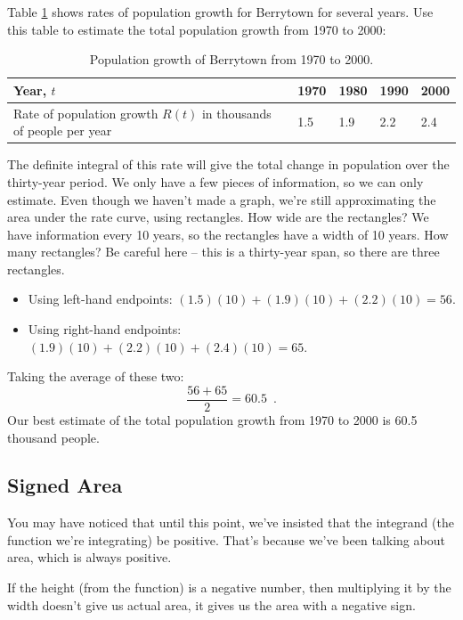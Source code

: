 \begin{example}
Table \ref{tab:5-3-population} shows rates of population growth for Berrytown for several years. Use this table to estimate the total population growth from 1970 to 2000:
\begin{table}[ht!]
  \centering
\begin{tabular}{lllll}
  \toprule
Year, $t$ &	1970 &	1980 &	1990 &	2000 \\
\midrule
Rate of population growth $R(t)$ in thousands of people per year &	1.5 &	1.9 &	2.2 &	2.4\\
\bottomrule
\end{tabular}
\caption{Population growth of Berrytown from 1970 to 2000.}
\label{tab:5-3-population}
\end{table}

\begin{solution}
The definite integral of this rate will give the total change in population over the thirty-year period. We only have a few pieces of information, so we can only estimate. Even though we haven't made a graph, we're still approximating the area under the rate curve, using rectangles. How wide are the rectangles? We have information every 10 years, so the rectangles have a width of 10 years. How many rectangles? Be careful here – this is a thirty-year span, so there are three rectangles.
  \begin{itemize}
    \item Using left-hand endpoints: $(1.5)(10) + (1.9)(10) + (2.2)(10) = 56$.
    \item Using right-hand endpoints: $(1.9)(10) + (2.2)(10) + (2.4)(10) = 65$.
  \end{itemize}
Taking the average of these two:
$$\dfrac{56+65}{2} = 60.5 \enspace .$$
Our best estimate of the total population growth from 1970 to 2000 is 60.5 thousand people.
\end{solution}\end{example}

\subsection{Signed Area}
You may have noticed that until this point, we've insisted that the integrand (the function we're integrating) be positive. That’s because we've been talking about area, which is always positive.

If the height (from the function) is a negative number, then multiplying it by the width doesn't give us actual area, it gives us the area with a negative sign.

